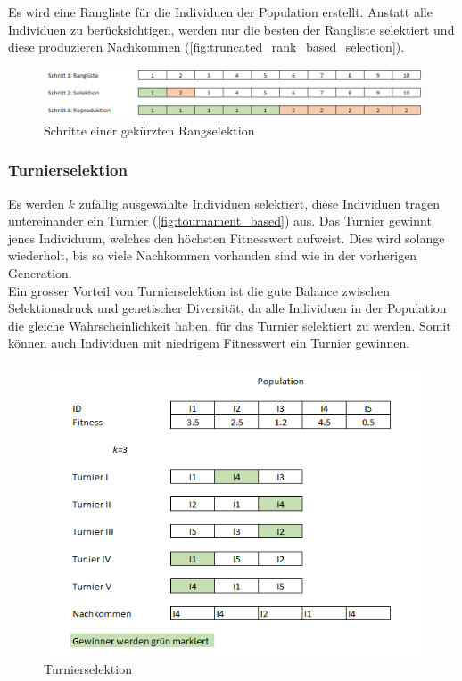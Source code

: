         Es wird eine Rangliste für die Individuen der Population erstellt.
        Anstatt alle Individuen zu berücksichtigen, werden nur die besten der Rangliste selektiert und diese produzieren Nachkommen (\vref{fig:truncated_rank_based_selection}).

        \begin{figure}[H]
          \includegraphics[width=\textwidth,center]{graphics/truncated_rank_based_selection}
          \caption{Schritte einer gekürzten Rangselektion\label{fig:truncated_rank_based_selection}}
        \end{figure}

      \subsubsection{Turnierselektion\label{subsub:Turnier}}

        Es werden \(k\) zufällig ausgewählte Individuen selektiert,
        diese Individuen tragen untereinander ein Turnier (\vref{fig:tournament_based}) aus.
        Das Turnier gewinnt jenes Individuum, welches den höchsten Fitnesswert aufweist.
        Dies wird solange wiederholt, bis so viele Nachkommen vorhanden sind wie in der vorherigen Generation.
        \\
        Ein grosser Vorteil von Turnierselektion ist die gute Balance zwischen
        Selektionsdruck und genetischer Diversität,
        da alle Individuen in der Population die gleiche Wahrscheinlichkeit haben, für das Turnier selektiert zu werden.
        Somit können auch Individuen mit niedrigem Fitnesswert ein Turnier gewinnen.

        \begin{figure}[H]
          \includegraphics[scale=1,center]{graphics/tournament_based}
          \caption{Turnierselektion\label{fig:tournament_based}}
        \end{figure}

